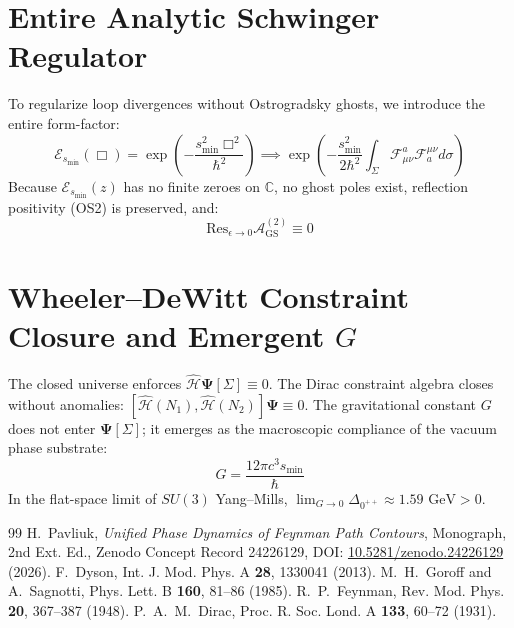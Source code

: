 \documentclass[11pt,a4paper]{article}
\begin{document}
\section{Entire Analytic Schwinger Regulator}
To regularize loop divergences without Ostrogradsky ghosts, we introduce the entire form-factor:
\begin{equation}
\mathcal{E}_{s_{\min}}(\Box) = \exp \left( - \frac{s_{\min}^2 \Box^2}{\hbar^2} \right) \implies \exp \left( - \frac{s_{\min}^2}{2\hbar^2} \int_\Sigma \mathcal{F}_{\mu\nu}^a \mathcal{F}^{\mu\nu}_a d\sigma \right)
\end{equation}
Because $\mathcal{E}_{s_{\min}}(z)$ has no finite zeroes on $\mathbb{C}$, no ghost poles exist, reflection positivity (OS2) is preserved, and:
\begin{equation}
\mathrm{Res}_{\epsilon \to 0} \mathcal{A}_{\text{GS}}^{(2)} \equiv 0
\end{equation}

\section{Wheeler--DeWitt Constraint Closure and Emergent $G$}
The closed universe enforces $\hat{\mathcal{H}} \mathbf{\Psi}[\Sigma] \equiv 0$. The Dirac constraint algebra closes without anomalies: $[\hat{\mathcal{H}}(N_1), \hat{\mathcal{H}}(N_2)] \mathbf{\Psi} \equiv 0$.
The gravitational constant $G$ does not enter $\mathbf{\Psi}[\Sigma]$; it emerges as the macroscopic compliance of the vacuum phase substrate:
\begin{equation}
G = \frac{12\pi c^3 s_{\min}}{\hbar}
\end{equation}
In the flat-space limit of $SU(3)$ Yang--Mills, $\lim_{G \to 0} \Delta_{0^{++}} \approx 1.59\text{ GeV} > 0$.

\begin{thebibliography}{99}
 H.~Pavliuk, \textit{Unified Phase Dynamics of Feynman Path Contours}, Monograph, 2nd Ext. Ed., Zenodo Concept Record 24226129, DOI: \href{https://doi.org/10.5281/zenodo.24226129}{10.5281/zenodo.24226129} (2026).
 F.~Dyson, Int. J. Mod. Phys. A \textbf{28}, 1330041 (2013).
 M.~H.~Goroff and A.~Sagnotti, Phys. Lett. B \textbf{160}, 81--86 (1985).
 R.~P.~Feynman, Rev. Mod. Phys. \textbf{20}, 367--387 (1948).
 P.~A.~M.~Dirac, Proc. R. Soc. Lond. A \textbf{133}, 60--72 (1931).
\end{thebibliography}
\end{document}
